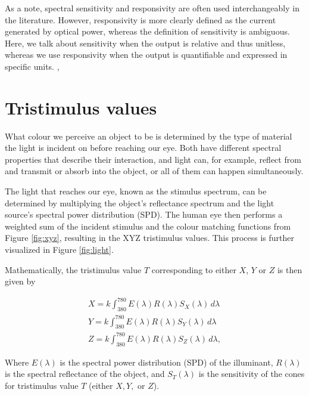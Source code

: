 As a note, spectral sensitivity and responsivity are often used interchangeably in the literature. However, responsivity is more clearly defined as the current generated by optical power, whereas the definition of sensitivity is ambiguous. Here, we talk about sensitivity when the output is relative and thus unitless, whereas we use responsivity when the output is quantifiable and expressed in specific units. \cite{Paschotta2005responsivity}, \cite{Paschotta2019sensitivity}

\section{Tristimulus values}
\label{sec:tristimulus}

What colour we perceive an object to be is determined by the type of material the light is incident on before reaching our eye. Both have different spectral properties that describe their interaction, and light can, for example, reflect from and transmit or absorb into the object, or all of them can happen simultaneously. 

The light that reaches our eye, known as the stimulus spectrum, can be determined by multiplying the object's reflectance spectrum and the light source's spectral power distribution (SPD). The human eye then performs a weighted sum of the incident stimulus and the colour matching functions from Figure \ref{fig:xyz}, resulting in the XYZ tristimulus values. This process is further visualized in Figure \ref{fig:light}.


Mathematically, the tristimulus value $T$ corresponding to either $X$, $Y$ or $Z$ is then given by

\begin{subequations}
\begin{align}
\label{eq:tristimulus}
X = k \int_{380}^{780} E(\lambda) R(\lambda) S_X(\lambda) \, d\lambda \\
Y = k \int_{380}^{780} E(\lambda) R(\lambda) S_Y(\lambda) \, d\lambda \\
Z = k \int_{380}^{780} E(\lambda) R(\lambda) S_Z(\lambda) \, d\lambda,
\end{align}
\end{subequations}

Where $E(\lambda)$ is the spectral power distribution (SPD) of the illuminant, $R(\lambda)$ is the spectral reflectance of the object, and $S_T(\lambda)$ is the sensitivity of the cones for tristimulus value \( T \) (either \( X, Y, \) or \( Z \)). 

